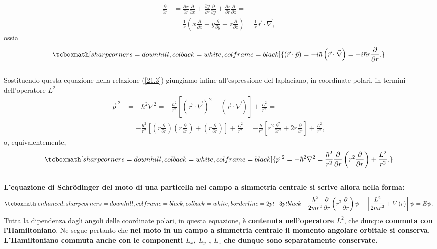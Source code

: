 	\begin{align} 
		\frac{\partial}{\partial r}&= \frac{\partial x}{\partial r} \frac{\partial}{\partial x}+\frac{\partial y}{\partial r} \frac{\partial}{\partial y}+\frac{\partial z}{\partial r} \frac{\partial}{\partial z}= \nonumber \\
		&=  \frac{1}{r}\left(x\frac{\partial}{\partial x}+y\frac{\partial}{\partial y}+z\frac{\partial}{\partial z}\right)=\frac{1}{r}\vec{r}\cdot\vec{\nabla} ,
	\end{align}
ossia
	\begin{equation}
		\tcboxmath[sharp corners=downhill, colback=white, colframe=black]{
			\left(\vec{r}\cdot\vec{p}\right)=-i\hbar\left(\vec{r}\cdot\vec{\nabla}\right)=-i\hbar r \frac{\partial}{\partial r} .
			}
	\end{equation}\\
	
Sostituendo questa equazione nella relazione (\ref{21.3}) giungiamo infine all'espressione del laplaciano, in coordinate polari, in termini dell'operatore $L^2$
	\begin{align}
		\vec{p}^{\ 2}&= -\hbar^2\nabla^2= -\frac{\hbar ^2}{r^2}\left[ \left( \vec{r}\cdot \vec{\nabla} \right) ^2 - \left( \vec{r}\cdot \vec{\nabla} \right)\right] +\frac{L^2}{r^2} = \nonumber \\
		&= -\frac{\hbar^2}{r^2}\left[\left(r\frac{\partial}{\partial r}\right)\left(r\frac{\partial}{\partial r}\right)+\left(r\frac{\partial}{\partial r}\right)\right]+\frac{L^2}{r^2}= -\frac{\hbar}{r^2}\left[r^2\frac{\partial^2}{\partial r^2}+2r\frac{\partial}{\partial r}\right]+\frac{L^2}{r^2} ,
	\end{align}
o, equivalentemente,
	\begin{equation}
		\tcboxmath[sharp corners=downhill, colback=white, colframe=black]{
			\vec{p}^{\ 2}=-\hbar^2\nabla^2=\frac{\hbar^2}{r^2}\frac{\partial}{\partial r}\left(r^2 \frac{\partial}{\partial r}\right)+\frac{L^2}{r^2} .
			}
	\end{equation}\\
	
\textbf{L'equazione di Schr\"{o}dinger del moto di una particella nel campo a simmetria centrale si scrive allora nella forma:}
	\begin{equation}
		\tcboxmath[enhanced, sharp corners=downhill, colframe=black, colback=white, borderline={2pt}{-3pt}{black}]{
			-\frac{\hbar^2}{2mr^2}\frac{\partial}{\partial r}\left(r^2\frac{\partial}{\partial r}\right)\psi+\left[\frac{L^2}{2mr^2}+V\left(r\right)\right]\psi=E\psi .
			}
	\end{equation}
Tutta la dipendenza dagli angoli delle coordinate polari, in questa equazione, è \textbf{contenuta nell'operatore $L^2$}, che dunque \textbf{commuta con l'Hamiltoniano}. Ne segue pertanto che\textbf{ nel moto in un campo a simmetria centrale il momento angolare orbitale si conserva}. \textbf{L'Hamiltoniano commuta anche con le componenti $L_x$, $L_y$ , $L_z$ che dunque sono separatamente conservate.}\\


